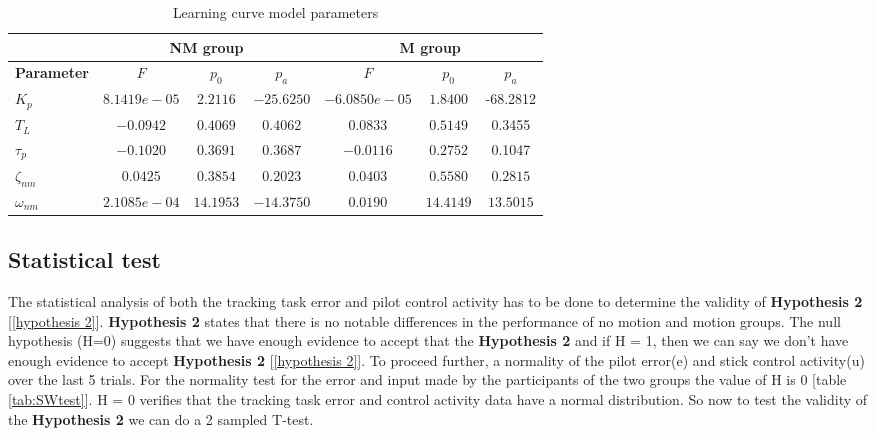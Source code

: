 \documentclass[conference]{IEEEtran}
\begin{document}
\begin{table}[h!]
\centering
\caption{Learning curve model parameters }
\begin{tabular}{l|c|c|c|c|c|c}
                   & \multicolumn{3}{c|}{\textbf{NM group}} & \multicolumn{3}{c}{\textbf{M group}}                           \\ \hline
\textbf{Parameter} & $F$          & $p_0$     & $p_a$      & $F$           & $p_0$    & $p_a$     \\ \hline\hline
$K_p$              & $8.1419e-05$   & $2.2116$    & $-25.6250$   & $-6.0850e-05$             & $1.8400$                    & -68.2812 \\
$T_L$              & $-0.0942$      & $0.4069$    & $0.4062$     & $0.0833$                  & $0.5149$                    & 0.3455   \\
$\tau_p$           & $-0.1020$      & $0.3691$    & $0.3687$     & $-0.0116$                 & $0.2752$                    & 0.1047   \\
$\zeta_{nm}$       & $0.0425$       & $0.3854$    & $0.2023$     & $0.0403$                  & $0.5580$                    & $0.2815$   \\
$\omega_{nm}$      & $2.1085e-04$   & $14.1953$   & $-14.3750$   & $0.0190$                  & $14.4149$                   & $13.5015$ 
\end{tabular}
\label{tab:learningcurve_pilot}
\end{table}



\subsection{Statistical test}
\label{sec:statisticaltests} 

The statistical analysis of both the tracking task error and pilot control activity has to be done to determine the validity of \textbf{Hypothesis 2} [\ref{hypothesis 2}]. \textbf{Hypothesis 2} states that there is no notable differences in the performance of no motion and motion groups. The null hypothesis (H=0) suggests that we have enough evidence to accept that the \textbf{Hypothesis 2} and if H = 1, then we can say we don't have enough evidence to accept \textbf{Hypothesis 2} [\ref{hypothesis 2}]. To proceed further, a normality of the pilot error(e) and stick control activity(u) over the last 5 trials. For the normality test for the error and input made by the participants of the two groups the value of H is 0 [table \ref{tab:SWtest}]. H = 0 verifies that the tracking task error and control activity data have a normal distribution. So now to test the validity of the \textbf{Hypothesis 2} we can do a 2 sampled T-test.\\ 
\end{document}
